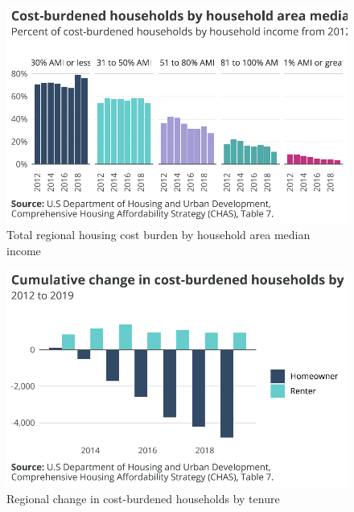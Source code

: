 \documentclass[
  letterpaper,
  DIV=11,
  numbers=noendperiod]{scrreprt}
\begin{document}
\begin{figure}[H]

{\centering \includegraphics{./part-3-1_files/figure-pdf/fig-cb-total-1.pdf}

}

\caption{\label{fig-cb-total}Total regional housing cost burden by
household area median income}

\end{figure}

\begin{figure}[H]

{\centering \includegraphics{./part-3-1_files/figure-pdf/fig-cb-change-1.pdf}

}

\caption{\label{fig-cb-change}Regional change in cost-burdened
households by tenure}

\end{figure}
\end{document}
